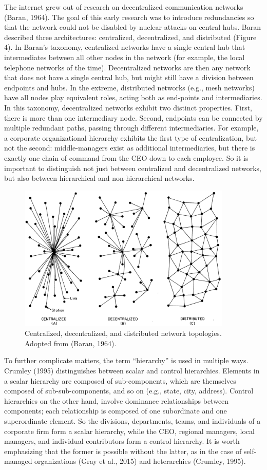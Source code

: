 The internet grew out of research on decentralized communication networks (Baran, 1964). The goal of this early research was to introduce redundancies so that the network could not be disabled by nuclear attacks on central hubs. Baran described three architectures: centralized, decentralized, and distributed (Figure 4). In Baran's taxonomy, centralized networks have a single central hub that intermediates between all other nodes in the network (for example, the local telephone networks of the time). Decentralized networks are then any network that does not have a single central hub, but might still have a division between endpoints and hubs. In the extreme, distributed networks (e.g., mesh networks) have all nodes play equivalent roles, acting both as end-points and intermediaries. In this taxonomy, decentralized networks exhibit two distinct properties. First, there is more than one intermediary node. Second, endpoints can be connected by multiple redundant paths, passing through different intermediaries. For example, a corporate organizational hierarchy exhibits the first type of centralization, but not the second: middle-managers exist as additional intermediaries, but there is exactly one chain of command from the CEO down to each employee. So it is important to distinguish not just between centralized and decentralized networks, but also between hierarchical and non-hierarchical networks.

\begin{figure}
\centering
\includegraphics[width=4in]{images/fig-decentralized.png}
\caption{
Centralized, decentralized, and distributed network topologies. Adopted from (Baran, 1964).
\label{fig:decentralization}
}
\end{figure}


To further complicate matters, the term ``hierarchy'' is used in multiple ways. Crumley (1995) distinguishes between scalar and control hierarchies. Elements in a scalar hierarchy are composed of sub-components, which are themselves composed of sub-sub-components, and so on (e.g., state, city, address). Control hierarchies on the other hand, involve dominance relationships between components; each relationship is composed of one subordinate and one superordinate element. So the divisions, departments, teams, and individuals of a corporate firm form a scalar hierarchy, while the CEO, regional managers, local managers, and individual contributors form a control hierarchy. It is worth emphasizing that the former is possible without the latter, as in the case of self-managed organizations (Gray et al., 2015) and heterarchies (Crumley, 1995).

